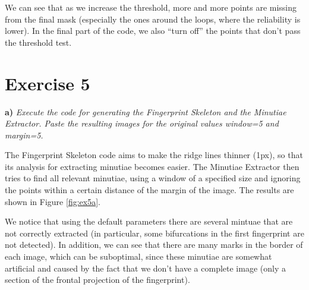 \documentclass[11pt]{article}
\begin{document}
We can see that as we increase the threshold, more and more points are missing from the final mask (especially the ones around the loops, where the reliability is lower). In the final part of the code, we also ``turn off'' the points that don't pass the threshold test.

\section*{Exercise 5}

\textbf{a) }\emph{Execute the code for generating the Fingerprint Skeleton and the Minutiae Extractor. Paste the resulting images for the original values window=5 and margin=5.}

The Fingerprint Skeleton code aims to make the ridge lines thinner (1px), so that its analysis for extracting minutiae becomes easier. The Minutiae Extractor then tries to find all relevant minutiae, using a window of a specified size and ignoring the points within a certain distance of the margin of the image. The results are shown in Figure \ref{fig:ex5a}.

We notice that using the default parameters there are several mintuae that are not correctly extracted (in particular, some bifurcations in the first fingerprint are not detected). In addition, we can see that there are many marks in the border of each image, which can be suboptimal, since these minutiae are somewhat artificial and caused by the fact that we don't have a complete image (only a section of the frontal projection of the fingerprint).
\end{document}
